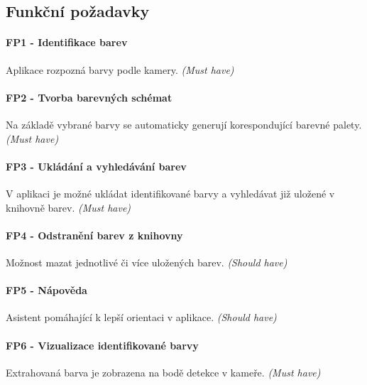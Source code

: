 \subsection{Funkční požadavky}
\paragraph{FP1 - Identifikace barev} Aplikace rozpozná barvy podle kamery. \emph{(Must have)} 
\paragraph{FP2 - Tvorba barevných schémat} Na základě vybrané barvy se automaticky generují korespondující barevné palety. \emph{(Must have)} 
\paragraph{FP3 - Ukládání a vyhledávání barev} V aplikaci je možné ukládat identifikované barvy a vyhledávat již uložené v knihovně barev. \emph{(Must have)} 
\paragraph{FP4 - Odstranění barev z knihovny} Možnost mazat jednotlivé či více uložených barev. \emph{(Should have)} 
\paragraph{FP5 - Nápověda} Asistent pomáhající k lepší orientaci v aplikace. \emph{(Should have)} 
\paragraph{FP6 - Vizualizace identifikované barvy} Extrahovaná barva je zobrazena na bodě detekce v kameře. \emph{(Must have)} 
